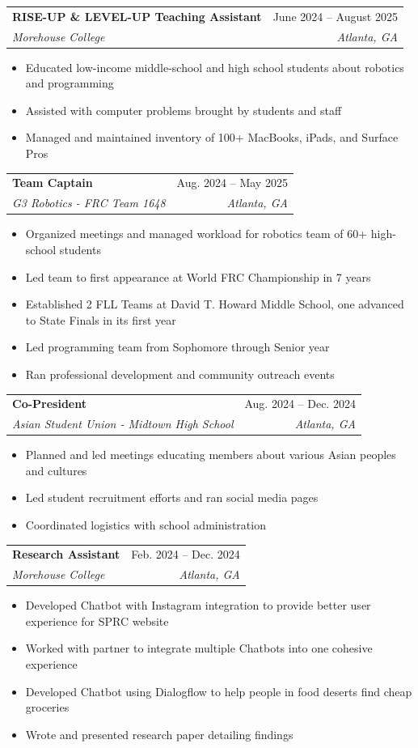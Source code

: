 \documentclass[letterpaper,11pt]{article}
\makeatletter
\newcommand{\resumeItem}[1]{
  \item\small{
    {#1 \vspace{-2pt}}
  }
}
\newcommand{\resumeSubheading}[4]{
  \vspace{-2pt}\item
    \begin{tabular*}{0.97\textwidth}[t]{l@{\extracolsep{\fill}}r}
      \textbf{#1} & #2 \\
      \textit{\small#3} & \textit{\small #4} \\
    \end{tabular*}\vspace{-7pt}
}
\newcommand{\resumeSubSubheading}[2]{
    \item
    \begin{tabular*}{0.97\textwidth}{l@{\extracolsep{\fill}}r}
      \textit{\small#1} & \textit{\small #2} \\
    \end{tabular*}\vspace{-7pt}
}
\newcommand{\resumeSubHeadingListEnd}{\end{itemize}}
\newcommand{\resumeItemListStart}{\begin{itemize}}
\newcommand{\resumeItemListEnd}{\end{itemize}\vspace{-5pt}}
\makeatother
\begin{document}
    \resumeSubheading
      {RISE-UP \& LEVEL-UP Teaching Assistant}{June 2024 -- August 2025}
      {Morehouse College}{Atlanta, GA}
      \resumeItemListStart
        \resumeItem{Educated low-income middle-school and high school students about robotics and programming}
        \resumeItem{Assisted with computer problems brought by students and staff}
        \resumeItem{Managed and maintained inventory of 100+ MacBooks, iPads, and Surface Pros}
    \resumeItemListEnd

    \resumeSubheading
      {Team Captain}{Aug. 2024 -- May 2025}
      {G3 Robotics - FRC Team 1648}{Atlanta, GA}
      \resumeItemListStart
        \resumeItem{Organized meetings and managed workload for robotics team of 60+ high-school students}
        \resumeItem{Led team to first appearance at World FRC Championship in 7 years}
        \resumeItem{Established 2 FLL Teams at David T. Howard Middle School, one advanced to State Finals in its first year}
        \resumeItem{Led programming team from Sophomore through Senior year}
        \resumeItem{Ran professional development and community outreach events}
      \resumeItemListEnd

    \resumeSubheading{Co-President}{Aug. 2024 -- Dec. 2024}{Asian Student Union - Midtown High School}{Atlanta, GA}
      \resumeItemListStart
        \resumeItem{Planned and led meetings educating members about various Asian peoples and cultures}
        \resumeItem{Led student recruitment efforts and ran social media pages}
        \resumeItem{Coordinated logistics with school administration}
      \resumeItemListEnd

    \resumeSubheading
      {Research Assistant}{Feb. 2024 -- Dec. 2024}
      {Morehouse College}{Atlanta, GA}
      \resumeItemListStart
        \resumeItem{Developed Chatbot with Instagram integration to provide better user experience for SPRC website}
        \resumeItem{Worked with partner to integrate multiple Chatbots into one cohesive experience}
        \resumeItem{Developed Chatbot using Dialogflow to help people in food deserts find cheap groceries}
        \resumeItem{Wrote and presented research paper detailing findings}
      \resumeItemListEnd
      
\end{document}

